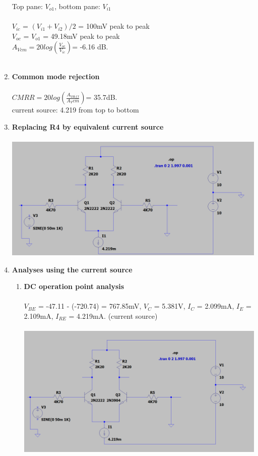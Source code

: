 \documentclass{article}
\begin{document}
\begin{enumerate}
		Top pane: \(V_{o1}\), bottom pane: \(V_{i1}\)\\\\
		\(V_{ic}\) = \((V_{i1} + V_{i2})/2\) = 100mV peak to peak\\
		\(V_{oc}\) = \(V_{o1}\) = 49.18mV peak to peak\\
		\(A_{Vcm} = 20log(\frac{V_{oc}}{V_{ic}}) \)= -6.16 dB.\\\\
		\item \textbf{Common mode rejection}\\\\
		\(CMRR = 20 log (\frac{A_{Vdiff}}{A_Vcm}) \)= 35.7dB.\\
		\pagebreak
		current source: 4.219 from top to bottom
		\item \textbf{Replacing R4 by equivalent current source}\\\\
		\includegraphics[scale=0.4]{prelab 4/circuit 5}
		\item \textbf{Analyses using the current source}
		\begin{enumerate}
			\item \textbf{DC operation point analysis}\\\\
			\(V_{BE}\) = -47.11 - (-720.74) = 767.85mV,  \(V_C\) = 5.381V, \(I_C\) = 2.099mA, \(I_E\) = 2.109mA, \(I_{RE}\) = 4.219mA. (current source)\\\\
			\includegraphics[scale=0.4]{prelab 4/circuit 5 - tr changed}\\\\

\end{enumerate}
\end{enumerate}
\end{document}
